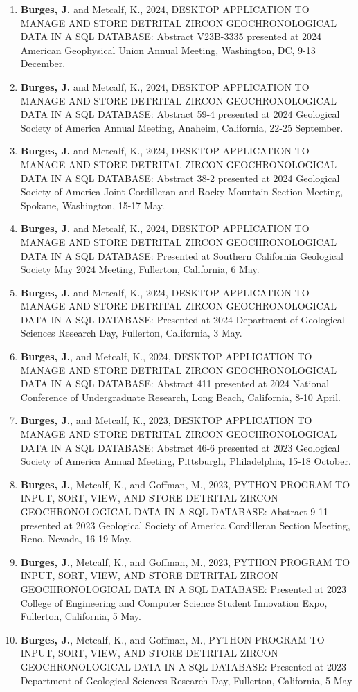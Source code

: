 \documentclass{res} %
\newcommand\reverselabel[1]{%
  \def\theenumi{}%
  \renewcommand\makelabel{\makebox[\dimexpr\labelwidth-3pt\relax][r]{%
    \the\numexpr#1-\value{enumi}+1\relax}}}%
\begin{document}
\begin{resume}
\begin{enumerate}
\reverselabel{10}%
\setlength{\itemindent}{-.25in}
  \item \textbf{Burges, J.} and Metcalf, K., 2024, DESKTOP APPLICATION TO MANAGE AND STORE DETRITAL ZIRCON
GEOCHRONOLOGICAL DATA IN A SQL DATABASE: Abstract V23B-3335 presented at 2024 American
Geophysical Union Annual Meeting, Washington, DC, 9-13 December.
\item \textbf{Burges, J.} and Metcalf, K., 2024, DESKTOP APPLICATION TO MANAGE AND STORE DETRITAL ZIRCON
GEOCHRONOLOGICAL DATA IN A SQL DATABASE: Abstract 59-4 presented at 2024 Geological Society of
America Annual Meeting, Anaheim, California, 22-25 September.
\item \textbf{Burges, J.} and Metcalf, K., 2024, DESKTOP APPLICATION TO MANAGE AND STORE DETRITAL ZIRCON
GEOCHRONOLOGICAL DATA IN A SQL DATABASE: Abstract 38-2 presented at 2024 Geological Society of
America Joint Cordilleran and Rocky Mountain Section Meeting, Spokane, Washington, 15-17 May.
\item \textbf{Burges, J.} and Metcalf, K., 2024, DESKTOP APPLICATION TO MANAGE AND STORE DETRITAL ZIRCON
GEOCHRONOLOGICAL DATA IN A SQL DATABASE: Presented at Southern California Geological Society
May 2024 Meeting, Fullerton, California, 6 May.
\item \textbf{Burges, J.} and Metcalf, K., 2024, DESKTOP APPLICATION TO MANAGE AND STORE DETRITAL ZIRCON
GEOCHRONOLOGICAL DATA IN A SQL DATABASE: Presented at 2024 Department of Geological Sciences
Research Day, Fullerton, California, 3 May.
\item \textbf{Burges, J.}, and Metcalf, K., 2024, DESKTOP APPLICATION TO MANAGE AND STORE
DETRITAL ZIRCON GEOCHRONOLOGICAL DATA IN A SQL DATABASE: Abstract
411 presented at 2024 National Conference of Undergraduate Research, Long Beach, California, 8-10 April.
\item \textbf{Burges, J.}, and Metcalf, K., 2023, DESKTOP APPLICATION TO MANAGE AND STORE
DETRITAL ZIRCON GEOCHRONOLOGICAL DATA IN A SQL DATABASE: Abstract
46-6 presented at 2023 Geological Society of America Annual Meeting, Pittsburgh, Philadelphia, 15-18
October.
\item \textbf{Burges, J.}, Metcalf, K., and Goffman, M., 2023, PYTHON PROGRAM TO INPUT, SORT, VIEW, AND STORE
DETRITAL ZIRCON GEOCHRONOLOGICAL DATA IN A SQL DATABASE: Abstract 9-11 presented at 2023
Geological Society of America Cordilleran Section Meeting, Reno, Nevada, 16-19 May.
\item \textbf{Burges, J.}, Metcalf, K., and Goffman, M., 2023, PYTHON PROGRAM TO INPUT, SORT, VIEW, AND STORE
DETRITAL ZIRCON GEOCHRONOLOGICAL DATA IN A SQL DATABASE: Presented at 2023 College of
Engineering and Computer Science Student Innovation Expo, Fullerton, California, 5 May.
\item \textbf{Burges, J.}, Metcalf, K., and Goffman, M., PYTHON PROGRAM TO INPUT, SORT, VIEW, AND STORE DETRITAL
ZIRCON GEOCHRONOLOGICAL DATA IN A SQL DATABASE: Presented at 2023 Department of Geological
Sciences Research Day, Fullerton, California, 5 May
\end{enumerate}


\end{resume}
\end{document}
